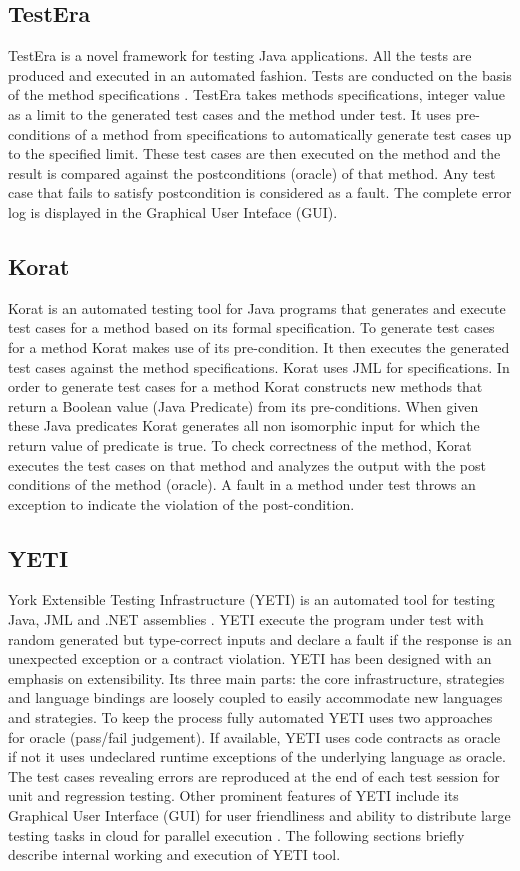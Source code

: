 \subsection{TestEra}
TestEra \cite{Khurshid2004} is a novel framework for testing Java applications. All the tests are produced and executed in an automated fashion. Tests are conducted on the basis of the method specifications \cite{Chang1999}. TestEra takes methods specifications, integer value as a limit to the generated test cases and the method under test. It uses pre-conditions of a method from specifications to automatically generate test cases up to the specified limit. These test cases are then executed on the method and the result is compared against the postconditions (oracle) of that method. Any test case that fails to satisfy postcondition is considered as a fault. The complete error log is displayed in the Graphical User Inteface (GUI).

\subsection{Korat}
Korat \cite{Boyapati2002} is an automated testing tool for Java programs that generates and execute test cases for a method based on its formal specification. To generate test cases for a method Korat makes use of its pre-condition. It then executes the generated test cases against the method specifications. Korat uses JML for specifications. In order to generate test cases for a method Korat constructs new methods that return a Boolean value (Java Predicate) from its pre-conditions. When given these Java predicates Korat generates all non isomorphic input for which the return value of predicate is true. To check correctness of the method, Korat executes the test cases on that method and analyzes the output with the post conditions of the method (oracle). A fault in a method under test throws an exception to indicate the violation of the post-condition.

\subsection{YETI}
York Extensible Testing Infrastructure (YETI) is an automated tool for testing Java, JML and .NET assemblies \cite{Oriol2010c}. YETI execute the program under test with random generated but type-correct inputs and declare a fault if the response is an unexpected exception or a contract violation. YETI has been designed with an emphasis on extensibility. Its three main parts: the core infrastructure, strategies and language bindings are loosely coupled to easily accommodate new languages and strategies. To keep the process fully automated YETI uses two approaches for oracle (pass/fail judgement). If available, YETI uses code contracts as oracle if not it uses undeclared runtime exceptions of the underlying language as oracle. The test cases revealing errors are reproduced at the end of each test session for unit and regression testing. Other prominent features of YETI include its Graphical User Interface (GUI) for user friendliness and ability to distribute large testing tasks in cloud for parallel execution \cite{Oriol2010}. The following sections briefly describe internal working and execution of YETI tool. 

